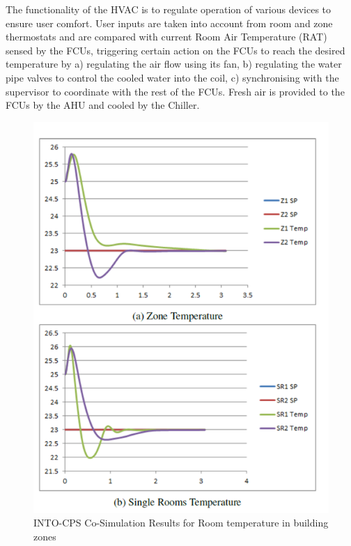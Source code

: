 The functionality of the HVAC is to regulate operation of various devices to ensure user comfort. User inputs are taken into account from room and zone thermostats and are compared with current Room Air Temperature (RAT) sensed by the FCUs, triggering certain action on the FCUs to reach the desired temperature by a) regulating the air flow using its fan, b) regulating the water pipe valves to control the cooled water into the coil, c) synchronising with the supervisor to coordinate with the rest of the FCUs. Fresh air is provided to the FCUs by the AHU and cooled by the Chiller.

\begin{figure}[!ht]
	\centering
		\includegraphics[width=0.9 \textwidth]{./figures/building}
	\caption{INTO-CPS Co-Simulation Results for Room temperature in building zones}
	\label{fig:building}
\end{figure}

